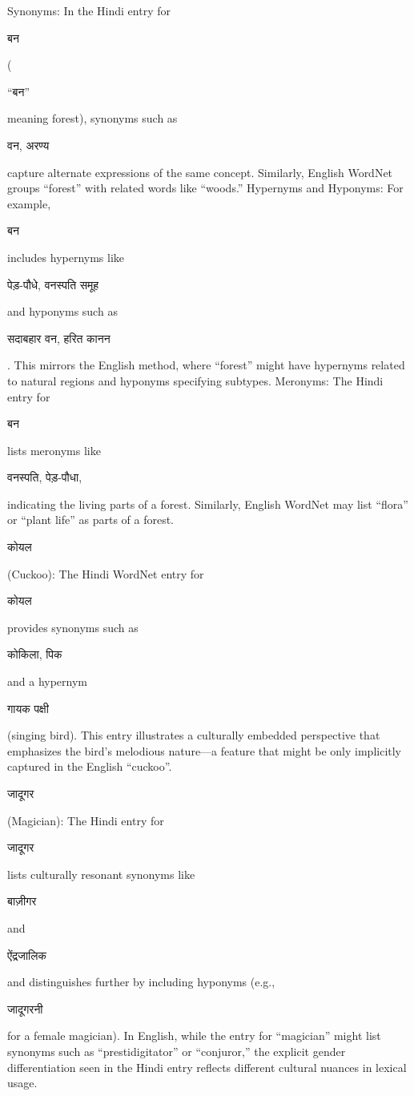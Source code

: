 \documentclass{article}
\begin{document}
Synonyms: In the Hindi entry for \begin{hindi} बन \end{hindi}(\begin{hindi} “बन” \end{hindi} meaning forest), synonyms such as \begin{hindi}वन, अरण्य \end{hindi}capture alternate expressions of the same concept. Similarly, English WordNet groups “forest” with related words like “woods.”
Hypernyms and Hyponyms: For example, \begin{hindi}बन \end{hindi}includes hypernyms like \begin{hindi}पेड़-पौधे, वनस्पति समूह\end{hindi} and hyponyms such as \begin{hindi}सदाबहार वन, हरित कानन\end{hindi}. This mirrors the English method, where “forest” might have hypernyms related to natural regions and hyponyms specifying subtypes.
Meronyms: The Hindi entry for \begin{hindi}बन \end{hindi}lists meronyms like\begin{hindi} वनस्पति, पेड़-पौधा, \end{hindi}indicating the living parts of a forest. Similarly, English WordNet may list “flora” or “plant life” as parts of a forest.

\begin{hindi}कोयल\end{hindi} (Cuckoo):
The Hindi WordNet entry for\begin{hindi} कोयल\end{hindi} provides synonyms such as \begin{hindi}कोकिला, पिक \end{hindi}and a hypernym \begin{hindi}गायक पक्षी \end{hindi}(singing bird). This entry illustrates a culturally embedded perspective that emphasizes the bird’s melodious nature—a feature that might be only implicitly captured in the English “cuckoo”.

\begin{hindi}जादूगर\end{hindi} (Magician):
The Hindi entry for \begin{hindi}जादूगर\end{hindi} lists culturally resonant synonyms like\begin{hindi} बाज़ीगर \end{hindi}and \begin{hindi}ऐंद्रजालिक\end{hindi} and distinguishes further by including hyponyms (e.g., \begin{hindi}जादूगरनी \end{hindi}for a female magician). In English, while the entry for “magician” might list synonyms such as “prestidigitator” or “conjuror,” the explicit gender differentiation seen in the Hindi entry reflects different cultural nuances in lexical usage.
\end{document}
